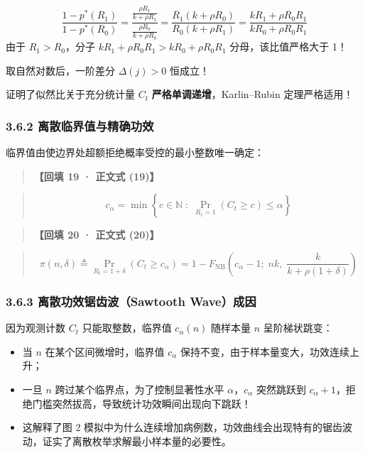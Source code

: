 \documentclass[11pt,a4paper]{ctexart}
\begin{document}
\[
\frac{1 - p^*(R_1)}{1 - p^*(R_0)} = \frac{\frac{\rho R_1}{k + \rho R_1}}{\frac{\rho R_0}{k + \rho R_0}} = \frac{R_1(k + \rho R_0)}{R_0(k + \rho R_1)} = \frac{k R_1 + \rho R_0 R_1}{k R_0 + \rho R_0 R_1}
\]
由于 $R_1 > R_0$，分子 $k R_1 + \rho R_0 R_1 > k R_0 + \rho R_0 R_1$ 分母，该比值严格大于 1！

取自然对数后，一阶差分 $\Delta(j) > 0$ 恒成立！

证明了似然比关于充分统计量 $C_t$ \textbf{严格单调递增}，Karlin–Rubin 定理严格适用！


\subsubsection{3.6.2 离散临界值与精确功效}
临界值由使边界处超额拒绝概率受控的最小整数唯一确定：


\begin{quote}\small\color{black!75}
\textbf{【回填 19 · 正文式 (19)】}
\end{quote}
\begin{quote}\small\color{black!75}
\begin{equation*}
c_\alpha = \min \left\{ c \in \mathbb{N} \;:\; \Pr_{R_t = 1}(C_t \ge c) \le \alpha \right\} \tag{eq:crit\_val}
\end{equation*}
\end{quote}

\begin{quote}\small\color{black!75}
\textbf{【回填 20 · 正文式 (20)】}
\end{quote}
\begin{quote}\small\color{black!75}
\begin{equation*}
\pi(n, \delta) \triangleq \Pr_{R_t = 1 + \delta}(C_t \ge c_\alpha) = 1 - F_{\operatorname{NB}}\!\left(c_\alpha - 1; \; nk, \; \frac{k}{k + \rho(1+\delta)}\right) \tag{eq:power\_exact}
\end{equation*}
\end{quote}

\subsubsection{3.6.3 离散功效锯齿波（Sawtooth Wave）成因}
因为观测计数 $C_t$ 只能取整数，临界值 $c_\alpha(n)$ 随样本量 $n$ 呈阶梯状跳变：

\begin{itemize}[leftmargin=2em, itemsep=2pt, parsep=0pt]
\item 当 $n$ 在某个区间微增时，临界值 $c_\alpha$ 保持不变，由于样本量变大，功效连续上升；
\item 一旦 $n$ 跨过某个临界点，为了控制显著性水平 $\alpha$，$c_\alpha$ 突然跳跃到 $c_\alpha + 1$，拒绝门槛突然拔高，导致统计功效瞬间出现向下跳跃！
\item 这解释了图 2 模拟中为什么连续增加病例数，功效曲线会出现特有的锯齿波动，证实了离散枚举求解最小样本量的必要性。
\end{itemize}
\end{document}
